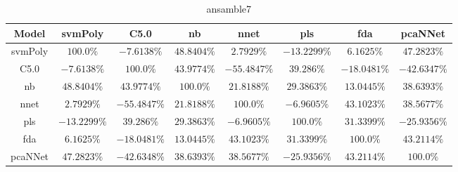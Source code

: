 \begin{table}[!ht]
	\centering
	\begin{tabular}{|c|c|c|c|c|c|c|c|}
		\hline
		Model & svmPoly & C5.0 & nb & nnet & pls & fda & pcaNNet \\ \hline
		svmPoly & $100.0\%$ & $-7.6138\%$ & $48.8404\%$ & $2.7929\%$ & $-13.2299\%$ & $6.1625\%$ & $47.2823\%$ \\ \hline
		C5.0 & $-7.6138\%$ & $100.0\%$ & $43.9774\%$ & $-55.4847\%$ & $39.286\%$ & $-18.0481\%$ & $-42.6347\%$ \\ \hline
		nb & $48.8404\%$ & $43.9774\%$ & $100.0\%$ & $21.8188\%$ & $29.3863\%$ & $13.0445\%$ & $38.6393\%$ \\ \hline
		nnet & $2.7929\%$ & $-55.4847\%$ & $21.8188\%$ & $100.0\%$ & $-6.9605\%$ & $43.1023\%$ & $38.5677\%$ \\ \hline
		pls & $-13.2299\%$ & $39.286\%$ & $29.3863\%$ & $-6.9605\%$ & $100.0\%$ & $31.3399\%$ & $-25.9356\%$ \\ \hline
		fda & $6.1625\%$ & $-18.0481\%$ & $13.0445\%$ & $43.1023\%$ & $31.3399\%$ & $100.0\%$ & $43.2114\%$ \\ \hline
		pcaNNet & $47.2823\%$ & $-42.6348\%$ & $38.6393\%$ & $38.5677\%$ & $-25.9356\%$ & $43.2114\%$ & $100.0\%$ \\ \hline
	\end{tabular}
	\caption{ansamble7}
	\label{tab:ansamble7}
\end{table}
